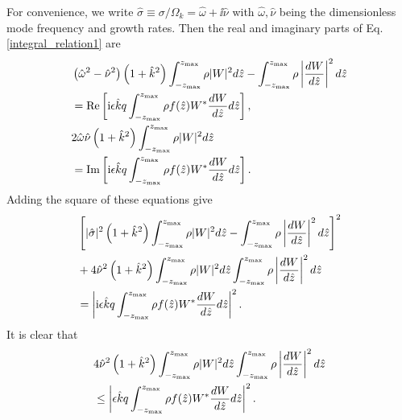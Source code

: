 For convenience, we write $\hat{\sigma}\equiv\sigma/\Omega_k = \hat{\omega} +
\ii\hat{\nu}$ with $\hat{\omega},\hat{\nu}$ being the dimensionless
mode frequency and growth rates. Then the real and imaginary parts of
Eq. \ref{integral_relation1} are
\begin{align}
  &\left(\hat{\omega}^2-\hat{\nu}^2\right)\left(1+\hat{k}^2\right)
   \int_{-z_\mathrm{max}}^{z_\mathrm{max}}\rho|W|^2d\hat{z} -
  \int_{-z_\mathrm{max}}^{z_\mathrm{max}}\rho\left|\frac{dW}{d\hat{z}}\right|^2d\hat{z}
  \notag\\
  &=\operatorname{Re}\left[\mathrm{i}
  \epsilon\hat{k}q\int_{-z_\mathrm{max}}^{z_\mathrm{max}}\rho
 f(\hat{z}) W^*\frac{dW}{d\hat{z}}d\hat{z}\right], \notag\\
& 2\hat{\omega}\hat{\nu}\left(1+\hat{k}^2\right)
   \int_{-z_\mathrm{max}}^{z_\mathrm{max}}\rho|W|^2d\hat{z}\notag\\
   &=\operatorname{Im}\left[\mathrm{i}
  \epsilon\hat{k}q\int_{-z_\mathrm{max}}^{z_\mathrm{max}}\rho
 f(\hat{z}) W^*\frac{dW}{d\hat{z}}d\hat{z}\right].
\end{align}
Adding the square of these equations give
\begin{align}
&\left[|\hat{\sigma}|^2\left(1+\hat{k}^2\right)
   \int_{-z_\mathrm{max}}^{z_\mathrm{max}}\rho|W|^2d\hat{z} -
  \int_{-z_\mathrm{max}}^{z_\mathrm{max}}\rho\left|\frac{dW}{d\hat{z}}\right|^2d\hat{z}\right]^2\notag\\
&+4\hat{\nu}^2\left(1+\hat{k}^2\right) 
  \int_{-z_\mathrm{max}}^{z_\mathrm{max}}\rho
   |W|^2d\hat{z}\int_{-z_\mathrm{max}}^{z_\mathrm{max}}\rho\left|\frac{dW}{d\hat{z}}\right|^2d\hat{z}\notag\\
   &=\left|\mathrm{i}
  \epsilon\hat{k}q\int_{-z_\mathrm{max}}^{z_\mathrm{max}}\rho
 f(\hat{z}) W^*\frac{dW}{d\hat{z}}d\hat{z}\right|^2.
\end{align}
It is clear that
\begin{align}\label{sigma_finite_domain} 
&4\hat{\nu}^2\left(1+\hat{k}^2\right) 
  \int_{-z_\mathrm{max}}^{z_\mathrm{max}}\rho
   |W|^2d\hat{z}\int_{-z_\mathrm{max}}^{z_\mathrm{max}}\rho\left|\frac{dW}{d\hat{z}}\right|^2d\hat{z}\notag\\
   &\leq\left|
  \epsilon\hat{k}q\int_{-z_\mathrm{max}}^{z_\mathrm{max}}\rho
 f(\hat{z}) W^*\frac{dW}{d\hat{z}}d\hat{z}\right|^2.
\end{align}
